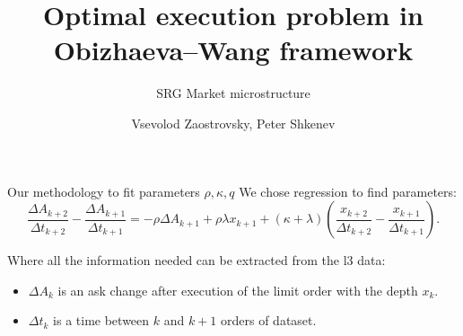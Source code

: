 \documentclass[aspectratio=169]{beamer}
\title{Optimal execution problem in Obizhaeva--Wang framework}
\subtitle{SRG Market microstructure}
\author{Vsevolod Zaostrovsky, Peter Shkenev}
\institute{Vega Institute Foundation}
\begin{document}
\maketitle

\begin{frame}{Our methodology to fit parameters $\rho, \kappa, q$}
    We chose regression to find parameters:                                                                                                                                                                                                                                                                                                                                                                                       
            \begin{equation*}
                \frac{\Delta A_{k+2}}{\Delta t_{k+2}} - \frac{\Delta A_{k+1}}{\Delta t_{k+1}} 
        = - \rho \Delta A_{k+1} + \rho \lambda x_{k+1} + (\kappa + \lambda) (\frac{x_{k+2}}{\Delta t_{k+2}} - \frac{x_{k+1}}{\Delta t_{k+1}}).
            \end{equation*}

        Where all the information needed can be extracted from the l3 data: 
        \begin{itemize}
            \item $\Delta A_{k}$ is an ask change after execution of the limit order with the depth $x_k$.
            \item $\Delta t_{k}$ is a time between $k$ and $k + 1$ orders of dataset.
        \end{itemize}
\end{frame}
\end{document}

